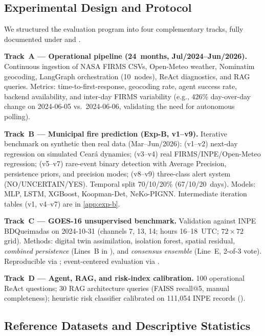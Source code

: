 
\subsection{Experimental Design and Protocol}
\label{sec:exp-protocol}

We structured the evaluation program into four complementary tracks, fully documented under  and .

\textbf{Track~A --- Operational pipeline (24~months, Jul/2024--Jun/2026).} Continuous ingestion of NASA FIRMS CSVs, Open-Meteo weather, Nominatim geocoding, LangGraph orchestration (10~nodes), ReAct diagnostics, and RAG queries. Metrics: time-to-first-response, geocoding rate, agent success rate, backend availability, and inter-day FIRMS variability (e.g., 426\% day-over-day change on 2024-06-05 vs.\ 2024-06-06, validating the need for autonomous polling).

\textbf{Track~B --- Municipal fire prediction (Exp-B, v1--v9).} Iterative benchmark on synthetic then real data (Mar--Jun/2026): (v1--v2) next-day regression on simulated Ceará dynamics; (v3--v4) real FIRMS/INPE/Open-Meteo regression; (v5--v7) rare-event binary detection with Average Precision, persistence priors, and precision modes; (v8--v9) three-class alert system (NO/UNCERTAIN/YES). Temporal split 70/10/20\% (67/10/20~days). Models: MLP, LSTM, XGBoost, Koopman-Det, NeKo-PIGNN. Intermediate iteration tables (v1, v4--v7) are in \ref{app:exp-b}.

\textbf{Track~C --- GOES-16 unsupervised benchmark.} Validation against INPE BDQueimadas on 2024-10-31 (channels 7, 13, 14; hours 16--18~UTC; $72\times72$ grid). Methods: digital twin assimilation, isolation forest, spatial residual, \emph{combined persistence} (Lines~B in ), and \emph{consensus ensemble} (Line~E, 2-of-3 vote). Reproducible via ; event-centered evaluation via .

\textbf{Track~D --- Agent, RAG, and risk-index calibration.} 100 operational ReAct questions; 30 RAG architecture queries (FAISS recall@5, manual completeness); heuristic risk classifier calibrated on 111{,}054 INPE records ().

\subsection{Reference Datasets and Descriptive Statistics}
\label{sec:hotspot-stats}

